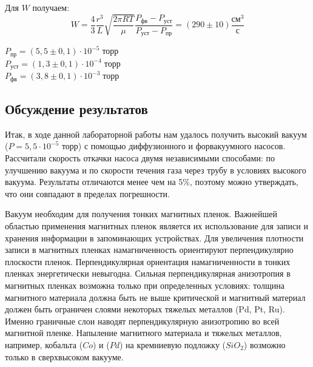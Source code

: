 \documentclass[a4paper, 12pt]{article}
\begin{document}
	Для $W$ получаем:
    \begin{equation}
    W=\frac{4}{3}\frac{r^3}{L}\sqrt{\frac{2\pi RT}{\mu}}\frac{P_{\text{фв}} - P_{\text{уст}}}{{P_\text{уст}} - P_{\text{пр}}}=(290 \pm 10)\frac{\text{см}^3}{\text{с}}
    \end{equation}

\begin{center}
	$ P_\text{пр} = (5,5 \pm 0,1) \cdot 10^{-5} \; \text{торр} $ \\
	$ P_\text{уст} = (1,3 \pm 0,1) \cdot 10^{-4} \; \text{торр} $ \\
	$ P_\text{фв} = (3,8 \pm 0,1) \cdot 10^{-3} \; \text{торр} $ \\
\end{center}	


	\newpage

	\begin{center}
		\section*{Обсуждение результатов}
	\end{center}
		
	Итак, в ходе данной лабораторной работы нам удалось получить высокий вакуум ($P = 5,5 \cdot 10^{-5}$ торр) с помощью диффузионного и форвакуумного насосов. Рассчитали скорость откачки насоса двумя независимыми способами: по улучшению вакуума и по скорости течения газа через трубу в условиях высокого вакуума. Результаты отличаются менее чем на 5\%, поэтому можно утверждать, что они совпадают в пределах погрешности. 
	
	Вакуум необходим для получения тонких магнитных пленок. Важнейшей областью применения магнитных пленок является их использование для записи и хранения информации в запоминающих устройствах. Для увеличения плотности записи в магнитных пленках намагниченность ориентируют перпендикулярно плоскости пленок. Перпендикулярная ориентация намагниченности в тонких пленках энергетически невыгодна. Сильная перпендикулярная анизотропия в магнитных пленках возможна только при определенных условиях: толщина магнитного материала должна быть не выше критической и магнитный материал должен быть ограничен слоями некоторых тяжелых металлов (Pd, Pt, Ru). Именно граничные слои наводят перпендикулярную анизотропию во всей магнитной пленке. Напыление магнитного материала и тяжелых металлов, например, кобальта ($Co$) и ($Pd$) на кремниевую подложку ($SiO_2$) возможно только в сверхвысоком вакууме.
	
\end{document}
